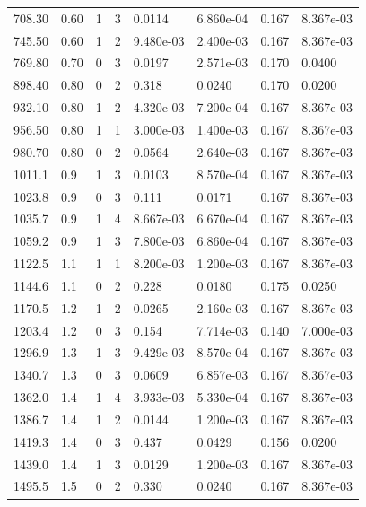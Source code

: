 \documentclass[preview]{standalone}
\begin{document}
{{\begin{tabular}{L{1.2cm}C{1.2cm} C{0.3cm}C{0.5cm} C{1.4cm}C{1.4cm} C{1.4cm}C{1.4cm}}
  708.30  &  0.60  & 1     &  3 &  0.0114  & 6.860e-04  & 0.167 &  8.367e-03   \\ 
  745.50  &  0.60  & 1     &  2 &  9.480e-03  & 2.400e-03  & 0.167 &  8.367e-03   \\ 
  769.80  &  0.70  & 0     &  3 &  0.0197  & 2.571e-03  & 0.170 &  0.0400   \\ 
  898.40  &  0.80  & 0     &  2 &  0.318  & 0.0240  & 0.170 &  0.0200   \\ 
  932.10  &  0.80  & 1     &  2 &  4.320e-03  & 7.200e-04  & 0.167 &  8.367e-03   \\ 
  956.50  &  0.80  & 1     &  1 &  3.000e-03  & 1.400e-03  & 0.167 &  8.367e-03   \\ 
  980.70  &  0.80  & 0     &  2 &  0.0564  & 2.640e-03  & 0.167 &  8.367e-03   \\ 
  1011.1  &   0.9  & 1     &  3 &  0.0103  & 8.570e-04  & 0.167 &  8.367e-03   \\ 
  1023.8  &   0.9  & 0     &  3 &  0.111  & 0.0171  & 0.167 &  8.367e-03   \\ 
  1035.7  &   0.9  & 1     &  4 &  8.667e-03  & 6.670e-04  & 0.167 &  8.367e-03   \\ 
  1059.2  &   0.9  & 1     &  3 &  7.800e-03  & 6.860e-04  & 0.167 &  8.367e-03   \\ 
  1122.5  &   1.1  & 1     &  1 &  8.200e-03  & 1.200e-03  & 0.167 &  8.367e-03   \\ 
  1144.6  &   1.1  & 0     &  2 &  0.228  & 0.0180  & 0.175 &  0.0250   \\ 
  1170.5  &   1.2  & 1     &  2 &  0.0265  & 2.160e-03  & 0.167 &  8.367e-03   \\ 
  1203.4  &   1.2  & 0     &  3 &  0.154  & 7.714e-03  & 0.140 &  7.000e-03   \\ 
  1296.9  &   1.3  & 1     &  3 &  9.429e-03  & 8.570e-04  & 0.167 &  8.367e-03   \\ 
  1340.7  &   1.3  & 0     &  3 &  0.0609  & 6.857e-03  & 0.167 &  8.367e-03   \\ 
  1362.0  &   1.4  & 1     &  4 &  3.933e-03  & 5.330e-04  & 0.167 &  8.367e-03   \\ 
  1386.7  &   1.4  & 1     &  2 &  0.0144  & 1.200e-03  & 0.167 &  8.367e-03   \\ 
  1419.3  &   1.4  & 0     &  3 &  0.437  & 0.0429  & 0.156 &  0.0200   \\ 
  1439.0  &   1.4  & 1     &  3 &  0.0129  & 1.200e-03  & 0.167 &  8.367e-03   \\ 
  1495.5  &   1.5  & 0     &  2 &  0.330  & 0.0240  & 0.167 &  8.367e-03   \\ 

\end{tabular}}}
\end{document}
